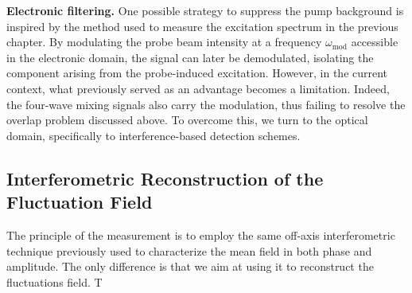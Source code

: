 \textbf{Electronic filtering.} One possible strategy to suppress the pump background is inspired by the method used to measure the excitation spectrum in the previous chapter. By modulating the probe beam intensity at a frequency \(\omega_{\text{mod}}\) accessible in the electronic domain, the signal can later be demodulated, isolating the component arising from the probe-induced excitation. However, in the current context, what previously served as an advantage becomes a limitation. Indeed, the four-wave mixing signals also carry the modulation, thus failing to resolve the overlap problem discussed above. To overcome this, we turn to the optical domain, specifically to interference-based detection schemes.

\subsection{Interferometric Reconstruction of the Fluctuation Field}

The principle of the measurement is to employ the same off-axis interferometric technique previously used to characterize the mean field in both phase and amplitude. The only 
difference is that we aim at using it to reconstruct the fluctuations field. T
